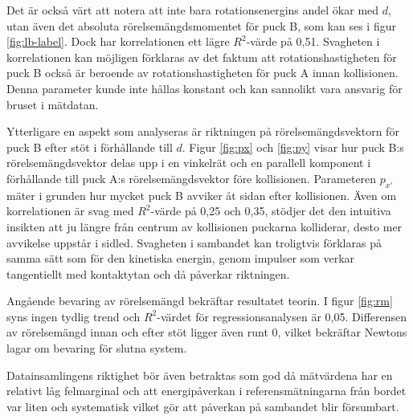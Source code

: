 Det är också värt att notera att inte bara rotationsenergins andel ökar med \(d\), utan även det absoluta rörelsemängdsmomentet för puck B, som kan ses i figur \ref{fig:lb-label}. Dock har korrelationen ett lägre $R^2$-värde på 0,51. Svagheten i korrelationen kan möjligen förklaras av det faktum att rotationshastigheten för puck B också är beroende av rotationshastigheten för puck A innan kollisionen. Denna parameter kunde inte hållas konstant och kan sannolikt vara ansvarig för bruset i mätdatan.

Ytterligare en aspekt som analyseras är riktningen på rörelsemängdsvektorn för puck B efter stöt i förhållande till \(d\). Figur \ref{fig:px} och \ref{fig:py} visar hur puck B:s rörelsemängdsvektor delas upp i en vinkelrät och en parallell komponent i förhållande till puck A:s rörelsemängdsvektor före kollisionen. Parameteren \(p_{x'}\) mäter i grunden hur mycket puck B avviker åt sidan efter kollisionen. Även om korrelationen är svag med $R^2$-värde på 0,25 och 0,35, stödjer det den intuitiva insikten att ju längre från centrum av kollisionen puckarna kolliderar, desto mer avvikelse uppstår i sidled. Svagheten i sambandet kan troligtvis förklaras på samma sätt som för den kinetiska energin, genom impulser som verkar tangentiellt med kontaktytan och då påverkar riktningen.

Angående bevaring av rörelsemängd bekräftar resultatet teorin. I figur \ref{fig:rm} syns ingen tydlig trend och  $R^2$-värdet för regressionsanalysen är 0,05. Differensen av rörelsemängd innan och efter stöt ligger även runt 0, vilket bekräftar Newtons lagar om bevaring för slutna system.

Datainsamlingens riktighet bör även betraktas som god då mätvärdena har en relativt låg felmarginal och att energipåverkan i referensmätningarna från bordet var liten och systematisk vilket gör att påverkan på sambandet blir försumbart.


